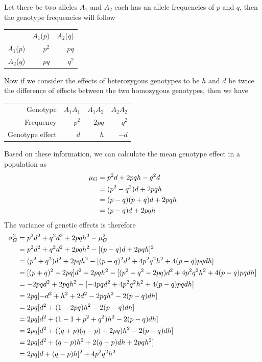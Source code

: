 \documentclass{book}
\begin{document}
	Let there be two alleles $A_1$ and $A_2$ each has an allele frequencies of $p$ and $q$, then the genotype frequencies will follow
	\begin{table}[H]
		\centering
		\begin{tabular}{rrr}
			&$A_1$($p$)&$A_2$($q$)\\
			$A_1$($p$)&$p^2$&$pq$\\
			$A_2$($q$)&$pq$&$q^2$
		\end{tabular}
	\end{table} 
	Now if we consider the effects of heterozygous genotypes to be $h$ and $d$ be twice the difference of effects between the two homozygous genotypes, then we have
	\begin{table}[H]
		\centering
		\begin{tabular}{rrrr}
			Genotype &$A_1A_1$&	$A_1A_2$&$A_2A_2$\\
			Frequency& $p^2$&$2pq$&$q^2$\\
			Genotype effect& $d$&$h$&$-d$
		\end{tabular}
	\end{table} 
	Based on these information, we can calculate the mean genotype effect in a population as
	\begin{align}
	\mu_G &= p^2d+2pqh-q^2d\notag\\
	&=(p^2-q^2)d+2pqh\notag\\
	&=(p-q)(p+q)d+2pqh\notag\\
	&=(p-q)d+2pqh
	\end{align}
	The variance of genetic effects is therefore
	\begin{align}
	\sigma_G^2 &= p^2d^2+q^2d^2+2pqh^2-\mu_G^2\notag\\
	&=p^2d^2+q^2d^2+2pqh^2-[(p-q)d+2pqh]^2\notag\\
	&=(p^2+q^2)d^2+2pqh^2-[(p-q)^2d^2+4p^2q^2h^2+4(p-q)pqdh]\notag\\
	&=[(p+q)^2-2pq]d^2+2pqh^2-[(p^2+q^2-2pq)d^2+4p^2q^2h^2+4(p-q)pqdh]\notag\\
	&=-2pqd^2+2pqh^2-[-4pqd^2+4p^2q^2h^2+4(p-q)pqdh]\notag\\
	&=2pq[-d^2+h^2+2d^2-2pqh^2-2(p-q)dh]\notag\\
	&=2pq[d^2+(1-2pq)h^2-2(p-q)dh]\notag\\
	&=2pq[d^2+(1-1+p^2+q^2)h^2-2(p-q)dh]\notag\\
	&=2pq[d^2+((q+p)(q-p)+2pq)h^2-2(p-q)dh]\notag\\
	&=2pq[d^2+(q-p)h^2+2(q-p)dh+2pqh^2]\notag\\
	&=2pq[d+(q-p)h]^2+4p^2q^2h^2
	\end{align}
\end{document}
